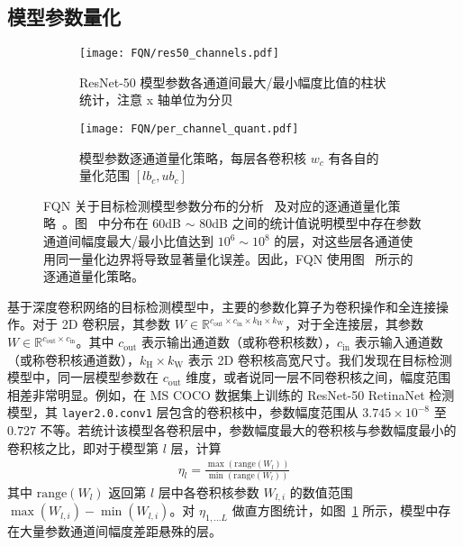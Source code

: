 \subsection{模型参数量化} \label{sec::fqn::q_weight}

\begin{figure}[htb]
  \centering
  \begin{subfigure}[t]{0.45\columnwidth}
    \centering
    \texttt{[image: FQN/res50\_channels.pdf]}
    \caption{ResNet-50 模型参数各通道间最大/最小幅度比值的柱状统计，注意 x 轴单位为分贝}
    \label{img::fqn::w_channels}
  \end{subfigure}
  \quad
  \begin{subfigure}[t]{0.45\columnwidth}
    \centering
    \texttt{[image: FQN/per\_channel\_quant.pdf]}
    \caption{模型参数逐通道量化策略，每层各卷积核 $w_c$ 有各自的量化范围 $[lb_c, ub_c]$}
    \label{img::fqn::channel_quant}
  \end{subfigure}
  \caption{FQN 关于目标检测模型参数分布的分析~ 及对应的逐通道量化策略~。图~ 中分布在 60dB $\sim$ 80dB 之间的统计值说明模型中存在参数通道间幅度最大/最小比值达到 $10^6 \sim 10^8$ 的层，对这些层各通道使用同一量化边界将导致显著量化误差。因此，FQN 使用图~ 所示的逐通道量化策略。}
  \label{img::fqn::w_quant}
\end{figure}

基于深度卷积网络的目标检测模型中，主要的参数化算子为卷积操作和全连接操作。对于 2D 卷积层，其参数 $W \in \mathbb{R}^{c_{\mathrm{out}} \times c_{\mathrm{in}} \times k_{\mathrm{H}} \times k_{\mathrm{W}}}$，对于全连接层，其参数 $W \in \mathbb{R}^{c_{\mathrm{out}} \times c_{\mathrm{in}}}$。其中 $c_{\mathrm{out}}$ 表示输出通道数（或称卷积核数），$c_{\mathrm{in}}$ 表示输入通道数（或称卷积核通道数），$k_{\mathrm{H}} \times k_{\mathrm{W}}$ 表示 2D 卷积核高宽尺寸。我们发现在目标检测模型中，同一层模型参数在 $c_{\mathrm{out}}$ 维度，或者说同一层不同卷积核之间，幅度范围相差非常明显。例如，在 MS COCO 数据集上训练的 ResNet-50 RetinaNet 检测模型，其 \verb|layer2.0.conv1| 层包含的卷积核中，参数幅度范围从 $3.745 \times 10^{−8}$ 至 $0.727$ 不等。若统计该模型各卷积层中，参数幅度最大的卷积核与参数幅度最小的卷积核之比，即对于模型第 $l$ 层，计算
\begin{align}
  \eta_l = \frac{\max(\mathrm{range} (W_l))}{\min(\mathrm{range}(W_l))} \label{eq::fqn::w_range_ratio}
\end{align}
其中 $\mathrm{range}(W_l)$ 返回第 $l$ 层中各卷积核参数 $W_{l, i}$ 的数值范围 $\max(W_{l, i}) - \min(W_{l, i})$。对 $\eta_{1, \ldots L}$ 做直方图统计，如图~\ref{img::fqn::w_channels} 所示，模型中存在大量参数通道间幅度差距悬殊的层。

